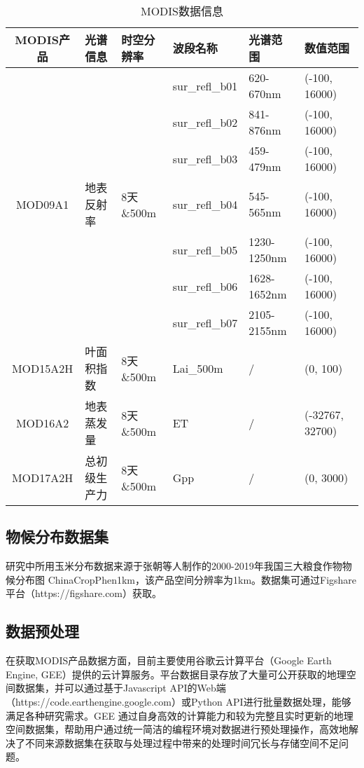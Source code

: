 \begin{table}
  \centering
  \caption{MODIS数据信息}
  \label{tab:modis}
  \begin{tabularx}{\linewidth}{cX<{\centering}X<{\centering}X<{\centering}X<{\centering}X<{\centering}}
      \toprule
      MODIS产品 & 光谱信息 & 时空分辨率 & 波段名称 & 光谱范围 & 数值范围 \\
      \midrule
      & & & sur\_refl\_b01 & 620-670nm & (-100, 16000) \\
      & & & sur\_refl\_b02 & 841-876nm & (-100, 16000) \\
      & & & sur\_refl\_b03 & 459-479nm & (-100, 16000) \\
      MOD09A1 & 地表反射率 & 8天\&500m & sur\_refl\_b04 & 545-565nm & (-100, 16000) \\
      & & & sur\_refl\_b05 & 1230-1250nm & (-100, 16000) \\
      & & & sur\_refl\_b06 & 1628-1652nm & (-100, 16000) \\
      & & & sur\_refl\_b07 & 2105-2155nm & (-100, 16000) \\ \hline
      MOD15A2H  & 叶面积指数 & 8天\&500m & Lai\_500m & / & (0, 100) \\ \hline
      MOD16A2   & 地表蒸发量 & 8天\&500m & ET & / & (-32767, 32700) \\ \hline
      MOD17A2H  & 总初级生产力 & 8天\&500m & Gpp & / & (0, 3000) \\
      \bottomrule
  \end{tabularx}
\end{table}

\subsection{物候分布数据集}
\par 研究中所用玉米分布数据来源于张朝等人制作的2000-2019年我国三大粮食作物物候分布图 ChinaCropPhen1km\cite{luo2020chinacropphen1km}，该产品空间分辨率为1km。数据集可通过Figshare平台（https://figshare.com）获取。

\subsection{数据预处理}
\par 在获取MODIS产品数据方面，目前主要使用谷歌云计算平台（Google Earth Engine, GEE）提供的云计算服务\cite{gorelick2017google}。平台数据目录存放了大量可公开获取的地理空间数据集，并可以通过基于Javascript API的Web端（https://code.earthengine.google.com）或Python API进行批量数据处理，能够满足各种研究需求。GEE 通过自身高效的计算能力和较为完整且实时更新的地理空间数据集，帮助用户通过统一简洁的编程环境对数据进行预处理操作，高效地解决了不同来源数据集在获取与处理过程中带来的处理时间冗长与存储空间不足问题。

